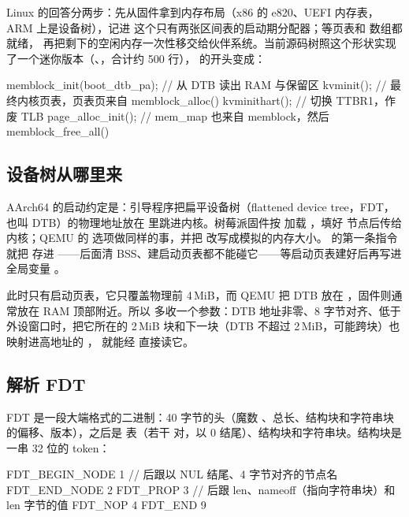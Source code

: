 Linux 的回答分两步：先从固件拿到内存布局（x86 的 e820、UEFI 内存表，ARM 上是设备树），记进  这个只有两张区间表的启动期分配器；等页表和  数组都就绪， 再把剩下的空闲内存一次性移交给伙伴系统。当前源码树照这个形状实现了一个迷你版本（、，合计约 500 行）， 的开头变成：

\begin{ccode}
memblock_init(boot_dtb_pa);  // 从 DTB 读出 RAM 与保留区
kvminit();                   // 最终内核页表，页表页来自 memblock_alloc()
kvminithart();               // 切换 TTBR1，作废 TLB
page_alloc_init();           // mem_map 也来自 memblock，然后 memblock_free_all()
\end{ccode}

\subsection{设备树从哪里来}

AArch64 的启动约定是：引导程序把扁平设备树（flattened device tree，FDT，也叫 DTB）的物理地址放在  里跳进内核。树莓派固件按  加载 ，填好  节点后传给内核；QEMU 的  选项做同样的事，并把  改写成模拟的内存大小。 的第一条指令就把  存进 ——后面清 BSS、建启动页表都不能碰它——等启动页表建好后再写进全局变量 。

此时只有启动页表，它只覆盖物理前 4\,MiB，而 QEMU 把 DTB 放在 ，固件则通常放在 RAM 顶部附近。所以  多收一个参数：DTB 地址非零、8 字节对齐、低于外设窗口时，把它所在的 2\,MiB 块和下一块（DTB 不超过 2\,MiB，可能跨块）也映射进高地址的 ， 就能经  直接读它。

\subsection{解析 FDT}

FDT 是一段大端格式的二进制：40 字节的头（魔数 、总长、结构块和字符串块的偏移、版本），之后是  表（若干  对，以 0 结尾）、结构块和字符串块。结构块是一串 32 位的 token：

\begin{ccode}
FDT_BEGIN_NODE 1   // 后跟以 NUL 结尾、4 字节对齐的节点名
FDT_END_NODE   2
FDT_PROP       3   // 后跟 len、nameoff（指向字符串块）和 len 字节的值
FDT_NOP        4
FDT_END        9
\end{ccode}

